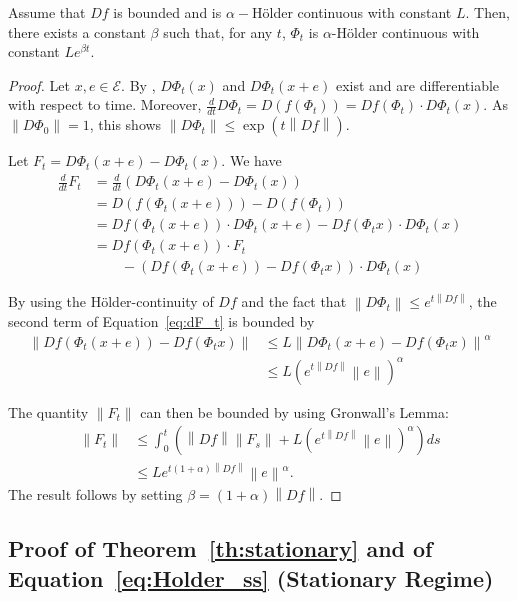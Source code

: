 \documentclass[sigconf]{acmart}
\newcommand\E{\mathcal{E}}
\newcommand\norm[1]{\left\|#1\right\|}
\newcommand\dt{\frac{d}{dt}}
\newcommand\p[1]{\left(#1\right)}
\begin{document}
\begin{lemma}
  \label{lem:Holder}
  Assume that $Df$ is bounded and is $\alpha-$Hölder continuous with
  constant $L$. Then, there exists a constant $\beta$ such that, for
  any $t$, $\Phi_t$ is $\alpha$-Hölder continuous with constant
  $Le^{\beta t}$.
\end{lemma}
\begin{proof}
  Let $x,e\in\E$. By \cite[Theorem~3.7.1 of Part~II]{cartan1977cours},
  $D\Phi_t(x)$ and $D\Phi_t(x+e)$ exist and are differentiable with
  respect to time. Moreover,
  $\dt D\Phi_t=D(f(\Phi_t))=Df(\Phi_t)\cdot D\Phi_t(x)$. As
  $\norm{D\Phi_0}=1$, this shows $\norm{D\Phi_t}\le\exp(t\norm{Df})$.

  Let $F_t=D\Phi_t(x+e)-D\Phi_t(x)$. We have
  \begin{align}
    \dt F_t &= \dt \p{D\Phi_t(x+e)-D\Phi_t(x)}\nonumber\\
            &= D(f(\Phi_t(x+e))) - D(f(\Phi_t))\nonumber\\
            &= Df (\Phi_t(x+e))\cdot D\Phi_t(x+e) - Df(\Phi_tx)\cdot
              D\Phi_t(x)\nonumber\\
            &= Df (\Phi_t(x+e))\cdot F_t \nonumber\\
            &\qquad -\p{Df(\Phi_t(x+e))-Df(\Phi_tx)}\cdot D\Phi_t(x)
              \label{eq:dF_t}
  \end{align}
  
  By using the Hölder-continuity of $Df$ and the fact that
  $\norm{D\Phi_t}\le e^{t\norm{Df}}$, the second term of
  Equation~\eqref{eq:dF_t} is bounded by
  \begin{align*}
    \norm{Df(\Phi_t(x+e))-Df(\Phi_tx)}
    &\le L\norm{D\Phi_t(x+e)-Df(\Phi_tx)}^\alpha\\
    &\le L(e^{t\norm{Df}}\norm{e})^\alpha 
  \end{align*}

  The quantity $\norm{F_t}$ can then be bounded by using Gronwall's
  Lemma:
  \begin{align*}
    \norm{F_t}&\le \int_0^t(\norm{Df} \norm{F_s} +
    L(e^{t\norm{Df}}\norm{e})^\alpha)ds \\
              &\le L e^{t(1+\alpha)\norm{Df}}\norm{e}^\alpha.
  \end{align*}
  The result follows by setting $\beta=(1+\alpha)\norm{Df}$.
\end{proof}



\subsection{Proof of Theorem~\ref{th:stationary} and of
  Equation~\eqref{eq:Holder_ss} (Stationary Regime)}
\label{sec:proof_ss}
\end{document}
